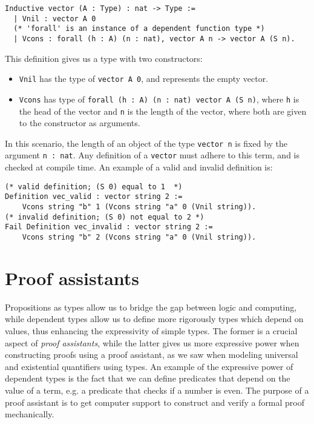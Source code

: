 \begin{minipage}{\linewidth}
\begin{lstlisting}[language=Coq, label={lst:dep_type_vec}, caption={\lstinline{vector} in Coq, using dependent types}]
Inductive vector (A : Type) : nat -> Type :=
  | Vnil : vector A 0
  (* 'forall' is an instance of a dependent function type *)
  | Vcons : forall (h : A) (n : nat), vector A n -> vector A (S n).
\end{lstlisting}
\end{minipage}

This definition gives us a type with two constructors:

\begin{itemize}
    \item
        \lstinline{Vnil} has the type of \lstinline{vector A 0}, and represents the empty vector.
    \item
        \lstinline{Vcons} has type of \lstinline{forall (h : A) (n : nat) vector A (S n)}, where \lstinline{h}
                            is the head of the vector and \lstinline{n} is the length of the vector,
                            where both are given to the constructor as arguments.
\end{itemize}

In this scenario, the length of an object of the type \lstinline{vector n} is fixed by the argument \lstinline{n : nat}.
Any definition of a \lstinline{vector} must adhere to this term, and is checked at compile time.
An example of a valid and invalid definition is:

\begin{minipage}{\linewidth}
\begin{lstlisting}[language=Coq, label={lst:dep_type_vec_ex}, caption={Examples of vectors in Coq}]
(* valid definition; (S 0) equal to 1  *)
Definition vec_valid : vector string 2 :=
    Vcons string "b" 1 (Vcons string "a" 0 (Vnil string)).
(* invalid definition; (S 0) not equal to 2 *)
Fail Definition vec_invalid : vector string 2 :=
    Vcons string "b" 2 (Vcons string "a" 0 (Vnil string)).
\end{lstlisting}
\end{minipage}

\section{Proof assistants}
\label{sec:proof_assistants}

Propositions as types allow us to bridge the gap between logic and computing,
while dependent types allow us to define more rigorously types which depend on values,
thus enhancing the expressivity of simple types.
The former is a crucial aspect of \emph{proof assistants}, while the latter gives
us more expressive power when constructing proofs using a proof assistant,
as we saw when modeling universal and existential quantifiers using types.
An example of the expressive power of dependent types is the fact that we can define
predicates that depend on the value of a term, e.g. a predicate that checks if a number is even.
The purpose of a proof assistant is to get computer support to construct and verify a formal proof mechanically.

